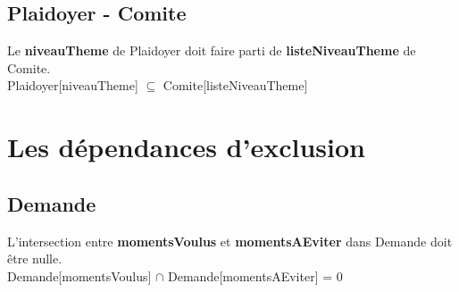 \documentclass[asi, sansVersion]{picInsa}
\begin{document}
\subsection*{Plaidoyer - Comite}
Le \textbf{niveauTheme} de Plaidoyer doit faire parti de \textbf{listeNiveauTheme} de Comite.\\
\indent \indent Plaidoyer[niveauTheme] $ \subseteq $ Comite[listeNiveauTheme]

\section{Les dépendances d'exclusion}

\subsection*{Demande}
L'intersection entre \textbf{momentsVoulus} et \textbf{momentsAEviter} dans Demande doit être nulle. \\
\indent \indent Demande[momentsVoulus] $ \cap $ Demande[momentsAEviter] = 0
\end{document}
